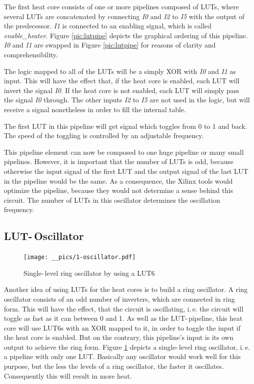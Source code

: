 The first heat core consists of one or more pipelines composed of \acp{LUT}, where several \acp{LUT} are concatenated by connecting \textit{I0} and \textit{I2} to \textit{I5} with the output of the predecessor.  \textit{I1} is connected to an enabling signal, which is called \textit{enable\_heater}. Figure \ref{pic:lutpipe} depicts the graphical ordering of this pipeline. \textit{I0} and \textit{I1} are swapped in Figure \ref{pic:lutpipe} for reasons of clarity and comprehensibility. 

The logic mapped to all of the \acp{LUT} will be a simply \ac{XOR} with \textit{I0} and \textit{I1} as input. This will have the effect that, if the heat core is enabled, each \ac{LUT} will invert the signal \textit{I0}. If the heat core is not enabled, each \ac{LUT} will simply pass the signal \textit{I0} through. The other inputs \textit{I2} to \textit{I5} are not used in the logic, but will receive a signal nonetheless in order to fill the internal table. 

The first \ac{LUT} in this pipeline will get signal which toggles from 0 to 1 and back. The speed of the toggling is controlled by an adjustable frequency. 

This pipeline element can now be composed to one huge pipeline or many small pipelines. However, it is important that the number of \acp{LUT} is odd, because otherwise the input signal of the first \ac{LUT} and the output signal of the last \ac{LUT} in the pipeline would be the same. As a consequence, the Xilinx tools would optimize the pipeline, because they would not determine a sense behind this circuit. The number of \acp{LUT} in this oscillator determines the oscillation frequency. 

\subsection{LUT-\,Oscillator}

\begin{figure}[h]
		\texttt{[image: \_\_pics/1-oscillator.pdf]}
		\caption{Single-\,level ring oscillator by using a LUT6}
		\label{pic:lutosc}	
	\end{figure} 

	
Another idea of using \acp{LUT} for the heat cores is to build a ring oscillator. A ring oscillator consists of an odd number of inverters, which are connected in ring form. This will have the effect, that the circuit is oscillating, i.\,e. the circuit will toggle as fast as it can between 0 and 1. As well as the \ac{LUT}-\,pipeline, this heat core will use \acp{LUT6} with an \ac{XOR} mapped to it, in order to toggle the input if the heat core is enabled. But on the contrary, this pipeline's input is its own output to achieve the ring form. Figure \ref{pic:lutosc} depicts a single-\,level ring oscillator, i.\,e. a pipeline with only one \ac{LUT}. Basically any oscillator would work well for this purpose, but the less the levels of a ring oscillator, the faster it oscillates. Consequently this will result in more heat.

